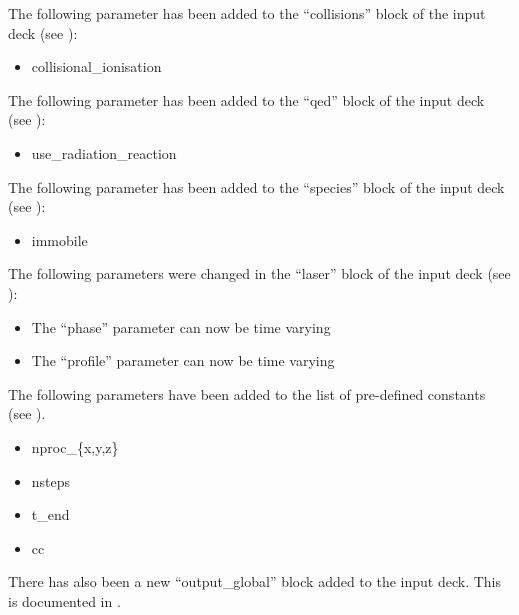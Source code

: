 \noindent The following parameter has been added to the ``collisions'' block of
the input deck (see ):
\begin{itemize}
\item collisional\_ionisation
\end{itemize}
\bigskip

\noindent The following parameter has been added to the ``qed'' block of
the input deck (see ):
\begin{itemize}
\item use\_radiation\_reaction
\end{itemize}
\bigskip

\noindent The following parameter has been added to the ``species'' block of
the input deck (see ):
\begin{itemize}
\item immobile
\end{itemize}
\bigskip

\noindent The following parameters were changed in the ``laser'' block of
the input deck (see ):
\begin{itemize}
\item The ``phase'' parameter can now be time varying
\item The ``profile'' parameter can now be time varying
\end{itemize}
\bigskip

\noindent The following parameters have been added to the list of pre-defined
constants (see ).
\begin{itemize}
\item nproc\_\{x,y,z\}
\item nsteps
\item t\_end
\item cc
\end{itemize}
\bigskip

\noindent There has also been a new ``output\_global'' block added to the
input deck. This is documented in .

